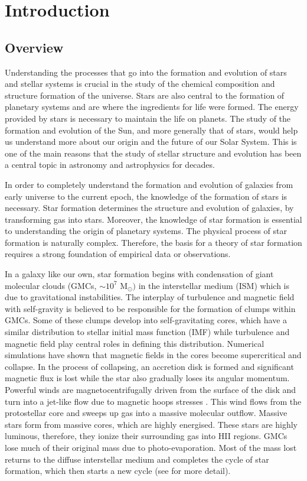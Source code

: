 \chapter{Introduction}
\label{chap:intro}

\section{Overview}

Understanding the processes that go into the formation and evolution of stars and stellar systems is crucial in the study of the chemical composition and structure formation of the universe. Stars are also central to the formation of planetary systems and are where the ingredients for life were formed. The energy provided by stars is necessary to maintain the life on planets. The study of the formation and evolution of the Sun, and more generally that of stars, would help us understand more about our origin and the future of our Solar System. This is one of the main reasons that the study of stellar structure and evolution has been a central topic in astronomy and astrophysics for decades.    
 
In order to completely understand the formation and evolution of galaxies from early universe to the current epoch, the knowledge of the formation of stars is necessary. Star formation determines the structure and evolution of galaxies, by transforming gas into stars. Moreover, the knowledge of star formation is essential to understanding the origin of planetary systems. The physical process of star formation is naturally complex. Therefore, the basis for a theory of star formation requires a strong foundation of empirical data or observations.

In a galaxy like our own, star formation begins with condensation of giant molecular clouds (GMCs, $\sim 10^7$ M$_{\odot})$ in the interstellar medium (ISM) which is due to gravitational instabilities. The interplay of turbulence and magnetic field with self-gravity is believed to be responsible for the formation of clumps within GMCs. Some of these clumps develop into self-gravitating cores, which have a similar distribution to stellar initial mass function (IMF) while turbulence and magnetic field play central roles in defining this distribution. Numerical simulations have shown that magnetic fields in the cores become supercritical and collapse\citep{Basu97}. In the process of  collapsing, an accretion disk is formed and significant magnetic flux is lost while the star also gradually loses its angular momentum. Powerful winds are magnetocentrifugally driven from the surface of the disk and turn into a jet-like flow due to magnetic hoops stresses \citep{Shu94}. This wind flows from the protostellar core and sweeps up gas into a massive molecular outflow. Massive stars form from massive cores, which are highly energised. These stars are highly luminous, therefore, they ionize their surrounding gas into HII regions. GMCs lose much of their original mass due to photo-evaporation. Most of the mass lost returns to the diffuse interstellar medium and completes the cycle of star formation, which then starts a new cycle (see \cite{McKee07} for more detail).  

